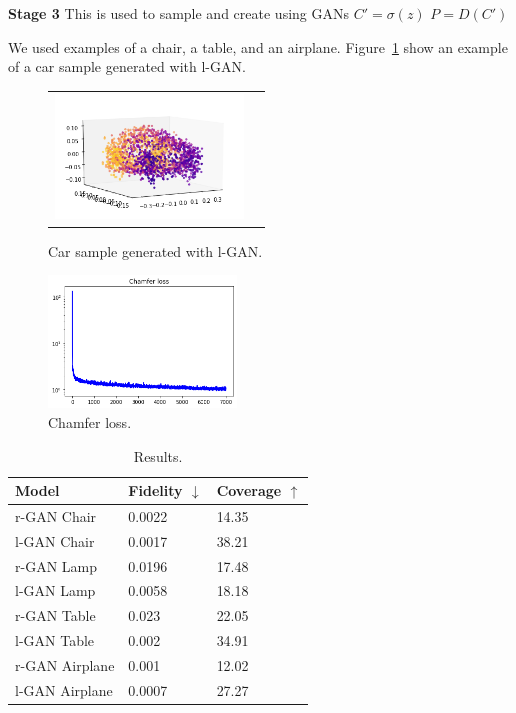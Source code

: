 \documentclass[12pt]{article}
\begin{document}
    \textbf{Stage 3}
    This is used to sample and create using GANs
    $C' = \sigma(z)$
    $P = D(C')$

    We used examples of a chair, a table, and an airplane.
    Figure~\ref{figure:car_sampled_with_lGAN} show an example of a car sample generated with l-GAN.

    \begin{figure}
        \centering
        \begin{tabular}{cc}
            \includegraphics[width = 50mm]{car-lgan}
        \end{tabular}
        \caption{Car sample generated with l-GAN.}
        \label{figure:car_sampled_with_lGAN}
    \end{figure}


    \begin{figure}
        \centering
        \includegraphics[width = 50mm]{chamfer-loss}
        \caption{Chamfer loss.}
        \label{figure:chamfer_loss}
    \end{figure}


    \begin{table}[H]
        \caption{Results.}
        \centering
        \begin{tabular}{lll}
            \toprule
            Model          & Fidelity $\downarrow$ & Coverage $\uparrow$ \\
            \midrule
            r-GAN Chair    & 0.0022                & 14.35               \\
            l-GAN Chair    & 0.0017                & 38.21               \\
            \midrule
            r-GAN Lamp     & 0.0196                & 17.48               \\
            l-GAN Lamp     & 0.0058                & 18.18               \\
            \midrule
            r-GAN Table    & 0.023                 & 22.05               \\
            l-GAN Table    & 0.002                 & 34.91               \\
            \midrule
            r-GAN Airplane & 0.001                 & 12.02               \\
            l-GAN Airplane & 0.0007                & 27.27               \\
            \bottomrule
        \end{tabular}
        \label{table:results}
    \end{table}
\end{document}
